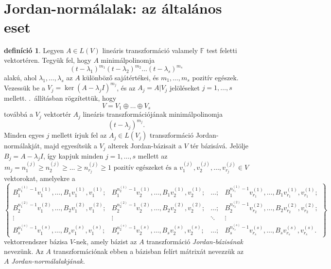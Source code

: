 \documentclass[9pt, a4paper, showtrims]{memoir}
\let\Aref\relax
\theoremstyle{plain}
\theoremstyle{remark}
\theoremstyle{definition}
\newtheorem{definition}[proposition]{definíció}
\begin{document}
\section{Jordan-normálalak: az általános eset}
\begin{definition}
    Legyen $A\in L\left( V \right)$ lineáris transzformáció valamely $\mathbb{F}$ test
    feletti vektortéren.
    Tegyük fel, hogy $A$ minimálpolinomja
    \[
        \left( t-\lambda_1 \right)^{m_1}\left( t-\lambda_2 \right)^{m_2}\dots\left( t-\lambda_s \right)^{m_s}
    \]
    alakú, ahol $\lambda_1,\dots,\lambda_s$ az $A$ különböző sajátértékei,
    és $m_1,\dots,m_s$ pozitív egészek.
    Vezessük be a $V_j=\ker\left( A-\lambda_j I \right)^{m_j}$, 
    és az $A_j=A|V_j$ jelöléseket $j=1,\dots,s$ mellett.
    \Aref{pr:redukcio-primfelbontas}.~állításban rögzítettük, hogy
    \[
        V=V_1\oplus\dots\oplus V_s
    \]
    továbbá a $V_j$ vektortér $A_j$ lineáris transzformációjának minimálpolinomja
    \[
        \left( t-\lambda_j \right)^{m_j}.
    \]
    Minden egyes $j$ mellett írjuk fel az $A_j\in L\left( V_j \right)$ transzformáció
    Jordan-normálakját,
    majd egyesítsük a $V_j$ alterek Jordan-bázisait a $V$ tér bázisává. 
    Jelölje $B_j=A-\lambda_j I$,
    így kapjuk minden $j=1,\dots,s$ mellett
    az
    \[
        m_j=n_1^{(j)}\geq n_2^{(j)}\geq\dots\geq n_{r_j}^{(j)}\geq 1
        \text{ pozitív egészeket és a }
        v_1^{(j)},v_2^{(j)},\dots,v_{r_j}^{(j)}\in V
    \]
    vektorokat, amelyekre a
    \[
    \begin{Bmatrix}
        B_1^{n_1^{(1)}-1}v_1^{(1)},\dots,B_1v_1^{(1)},v_1^{(1)};
        &
        B_1^{n_2^{(1)}-1}v_2^{(1)},\dots,B_1v_2^{(1)},v_2^{(1)};
        &
        \dots ;
        &
        B_1^{n_{r_1}^{(1)}-1}v_{r_1}^{(1)},\dots,B_1v_{r_1}^{(1)},v_{r_1}^{(1)};
    \\
        B_2^{n_1^{(2)}-1}v_1^{(2)},\dots,B_2v_1^{(2)},v_1^{(2)};
        &
        B_2^{n_2^{(2)}-1}v_2^{(2)},\dots,B_2v_2^{(2)},v_2^{(2)};
        &
        \dots ;
        &
        B_2^{n_{r_2}^{(2)}-1}v_{r_2}^{(2)},\dots,B_2v_{r_2}^{(2)},v_{r_2}^{(2)};
    \\
        \vdots&\vdots&\ddots&\vdots
    \\
        B_s^{n_1^{(s)}-1}v_1^{(s)},\dots,B_sv_1^{(s)},v_1^{(s)};
        &
        B_s^{n_2^{(s)}-1}v_2^{(s)},\dots,B_sv_2^{(s)},v_2^{(s)};
        &
        \dots ;
        &
        B_s^{n_{r_s}^{(s)}-1}v_{r_s}^{(s)},\dots,B_sv_{r_s}^{(s)},v_{r_s}^{(s)}.
    \end{Bmatrix}
    \]
    vektorrendszer bázisa $V$-nek, amely bázist az $A$ transzformáció \emph{Jordan-bázisának} nevezünk.
    Az $A$ transzformációnak ebben a bázisban felírt mátrixát nevezzük az $A$ \emph{Jordan-normálalakjának.}
\end{definition}
\end{document}
